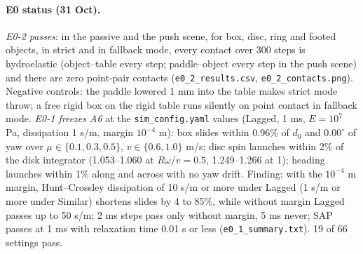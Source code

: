 \documentclass[10pt]{article}
\newcommand{\code}[1]{\texttt{#1}}
\begin{document}
\paragraph{E0 status (31 Oct).}  \emph{E0-2 passes}: in the passive and the push scene, for box, disc, ring and
footed objects, in strict and in fallback mode, every contact over 300 steps is hydroelastic (object--table every
step; paddle--object every step in the push scene) and there are zero point-pair contacts
(\code{e0\_2\_results.csv}, \code{e0\_2\_contacts.png}).  Negative controls: the paddle lowered 1 mm into the table
makes strict mode throw; a free rigid box on the rigid table runs silently on point contact in fallback mode.
\emph{E0-1 freezes A6} at the \code{sim\_config.yaml} values (Lagged, 1 ms, $E=10^{7}$ Pa, dissipation 1 s/m,
margin $10^{-4}$ m): box slides within 0.96\% of $d_0$ and $0.00^\circ$ of yaw over $\mu\in\{0.1,0.3,0.5\}$,
$v\in\{0.6,1.0\}$ m/s; disc spin launches within 2\% of the disk integrator (1.053--1.060 at $R\omega/v=0.5$,
1.249--1.266 at 1); heading launches within 1\% along and across with no yaw drift.  Finding: with the $10^{-4}$ m
margin, Hunt--Crossley dissipation of 10 s/m or more under Lagged (1 s/m or more under Similar) shortens slides by 4
to 85\%, while without margin Lagged passes up to 50 s/m; 2 ms steps pass only without margin, 5 ms never; SAP
passes at 1 ms with relaxation time 0.01 s or less (\code{e0\_1\_summary.txt}).  19 of 66 settings pass.
\end{document}
